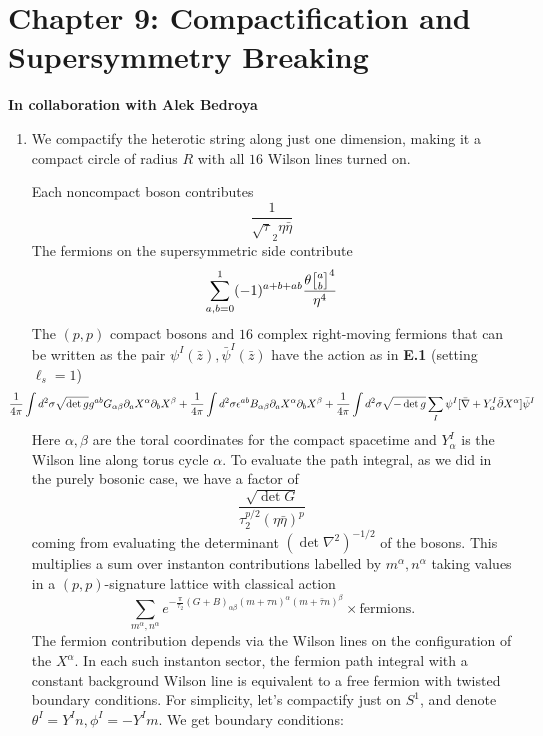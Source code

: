 \documentclass[11pt, class=article, crop=false]{standalone}
\begin{document}
\section*{Chapter 9: Compactification and Supersymmetry Breaking} %
\label{sec:chapter_9_compactification_and_supersymmetry_breaking}
\begin{center}
	\vspace{-.05in}
	\textbf{In collaboration with Alek Bedroya}
	\vspace{-.05in}
\end{center}
\begin{enumerate}
	\item We compactify the heterotic string along just one dimension, making it a compact circle of radius $R$ with all $16$ Wilson lines turned on. 
	
	Each noncompact boson contributes
		\[
			\frac{1}{\sqrt \tau_2 \eta \bar \eta }
		\]
	The fermions on the supersymmetric side contribute
		\[
			\sum_{a,b=0}^1 (-1)^{a+b+ab} \frac{\theta\twist{a}{b}^4}{\eta^4}
		\]
	The $(p,p)$ compact bosons and $16$ complex right-moving fermions that can be written as the pair $\psi^I(\bar z), \bar \psi^I(\bar z)$ have the action as in \textbf{E.1} (setting $\ell_s = 1$)
		\[		\hspace{-.3in}
			\frac{1}{4\pi} \int d^2 \sigma \sqrt{\det g} g^{ab} G_{\alpha \beta} \d_a X^\alpha \d_b X^\beta + \frac{1}{4\pi} \int d^2 \sigma \epsilon^{ab} B_{\alpha \beta}\d_a X^\alpha \d_b X^\beta + \frac{1}{4\pi} \int d^2 \sigma \sqrt{- \det g} \sum_I \psi^I [\bar \nabla + Y_\alpha^I \bar \d X^\alpha] \bar \psi^I
		\]
		Here $\alpha, \beta$ are the toral coordinates for the compact spacetime and $Y^I_\alpha$ is the Wilson line along torus cycle $\alpha$. To evaluate the path integral, as we did in the purely bosonic case, we have a factor of
		\[
			\frac{\sqrt{\det G}}{\tau_2^{p/2} (\eta \bar \eta)^{p}}
		\] 
		coming from evaluating the determinant $(\det \nabla^{2})^{-1/2}$ of the bosons. This multiplies a sum over instanton contributions labelled by $m^\alpha, n^\alpha$ taking values in a $(p,p)$-signature lattice with classical action 
		\[
			\sum_{m^\alpha, n^\alpha} e^{-\frac{\pi}{\tau_2} (G+B)_{\alpha \beta} (m + \tau n)^\alpha (m + \bar \tau n)^\beta} \times \text{fermions}.
		\]
		The fermion contribution depends via the Wilson lines on the configuration of the $X^\alpha$. In each such instanton sector, the fermion path integral with a constant background Wilson line is equivalent to a free fermion with twisted boundary conditions. For simplicity, let's compactify just on $S^1$, and denote $\theta^I = Y^I n, \phi^I = -Y^I m$. We get boundary conditions: 

\end{enumerate}
\end{document}
